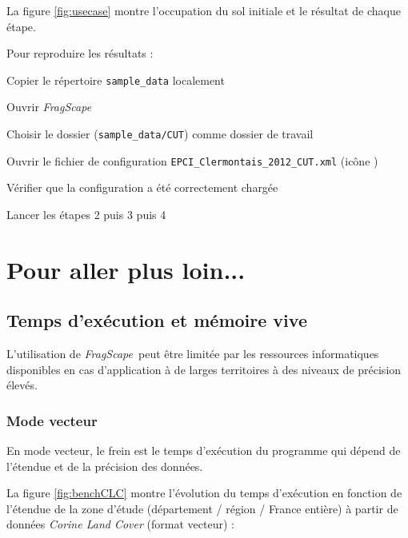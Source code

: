 \documentclass[11pt]{article}
\newcommand{\tool}{\emph{FragScape}}
\let\tempone\itemize
\let\temptwo\enditemize
\renewenvironment{itemize}{\tempone\addtolength{\itemsep}{-0.5\baselineskip}}{\temptwo}
\begin{document}
La figure \ref{fig:usecase} montre l'occupation du sol initiale et le résultat de chaque étape.

Pour reproduire les résultats :
\begin{itemize}
    \item Copier le répertoire \texttt{sample\_data} localement
    \item Ouvrir \tool
    \item Choisir le dossier (\texttt{sample\_data/CUT}) comme dossier de travail
    \item Ouvrir le fichier de configuration \texttt{EPCI\_Clermontais\_2012\_CUT.xml} (icône   )
    \item Vérifier que la configuration a été correctement chargée
    \item Lancer les étapes 2 puis 3 puis 4
\end{itemize}





\section{Pour aller plus loin...}



\subsection{Temps d'exécution et mémoire vive}
\label{sec:execTime}

L'utilisation de \tool\ peut être limitée par les ressources informatiques disponibles en cas d'application à de larges territoires à des niveaux de précision élevés.

\subsubsection{Mode vecteur}

En mode vecteur, le frein est le temps d'exécution du programme qui dépend de l'étendue et de la précision des données.

La figure \ref{fig:benchCLC} montre l'évolution du temps d'exécution en fonction de l'étendue de la zone d'étude (département / région / France entière) à partir de données \emph{Corine Land Cover} (format vecteur) :
\end{document}
